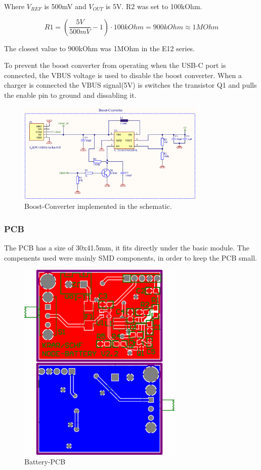        Where $V_{REF}$ \cite{noauthor_tlv61070apdf_2022} is 500mV and $V_{OUT}$ is 5V. R2 was set to 100kOhm.

        \begin{equation}
            R1 = ( \frac{5V}{500mV} - 1) \cdot 100kOhm = 900kOhm \approx 1MOhm
        \end{equation}

        The closest value to 900kOhm was 1MOhm in the E12 series.
        
        To prevent the boost converter from operating when the USB-C port is connected, the
        VBUS voltage is used to disable the boost converter. When a charger is connected
        the VBUS signal(5V) is switches the transistor Q1 and pulls the enable pin to ground 
        and dissabling it.
        
        \begin{figure}[H]
        \centering
        \includegraphics[width=0.8\textwidth]{assets/HW/Boost-Converter.png}
        \caption{Boost-Converter implemented in the schematic.}
        \end{figure}

    \subsubsection{PCB}

        The PCB has a size of 30x41.5mm, it fits directly under the basic module. 
        The compenents used were mainly SMD components, in order to keep the PCB small. 

        \begin{figure}[H]
            \centering
            \includegraphics[width=0.7\textwidth]{assets/HW/PCB-BATTERY-V2.2.png}
            \caption{Battery-PCB}
        \end{figure}



